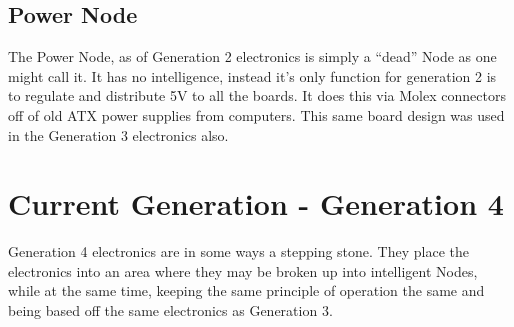 \documentclass{article}
\begin{document}
\subsection{Power Node}
The Power Node, as of Generation 2 electronics is simply a “dead” Node as one might call it. It has no intelligence, instead it's only function for generation 2 is to regulate and distribute 5V to all the boards. It does this via Molex connectors off of old ATX power supplies from computers. This same board design was used in the Generation 3 electronics also.\\
\section{Current Generation - Generation 4}
Generation 4 electronics are in some ways a stepping stone. They place the electronics into an area where they may be broken up into intelligent Nodes, while at the same time, keeping the same principle of operation the same and being based off the same electronics as Generation 3.\\
\end{document}
